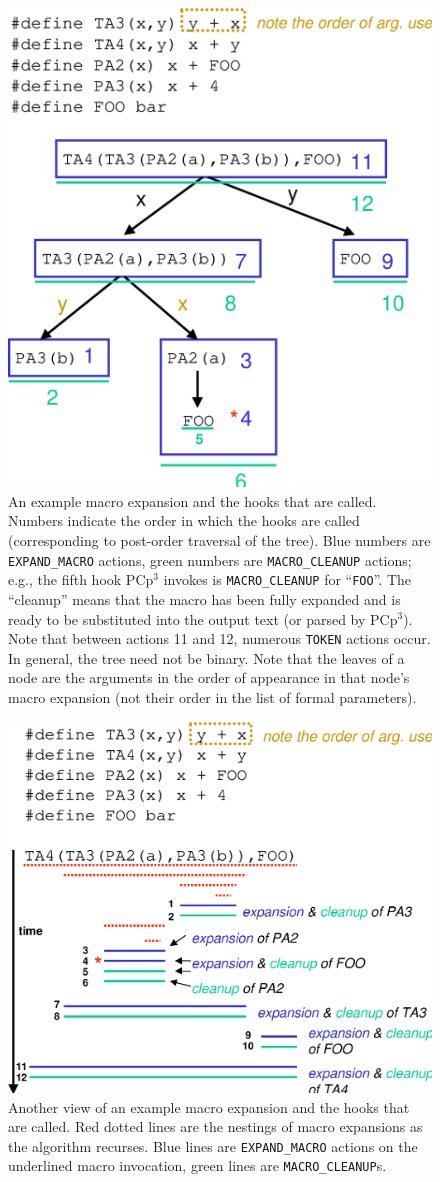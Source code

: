 \documentclass{article}
\newcommand{\pcp}{\mbox{\textsf{PCp}$^3$}}
\newcommand{\eg}{e.g.,}
\begin{document}
\begin{figure}[p]
  \begin{center}
    \leavevmode
    \includegraphics[width=0.45\linewidth]{figs/tree-expn.eps}
    \caption{An example macro expansion and the
      hooks that are called. Numbers indicate the order in which the
      hooks are called (corresponding to post-order traversal of the
      tree). Blue numbers are \texttt{EXPAND\_MACRO} actions, green
      numbers are \texttt{MACRO\_CLEANUP} actions; \eg{} the fifth hook
      \pcp{} invokes is \texttt{MACRO\_CLEANUP} for ``\texttt{FOO}''.
      The ``cleanup'' means that the macro has been fully expanded and
      is ready to be substituted into the output text (or parsed by
      \pcp{}). Note that between actions 11 and 12, numerous
      \texttt{TOKEN} actions occur.  In general, the tree need not be
      binary. Note that the leaves of a node are the arguments in the
      order of appearance in that node's macro expansion (not their
      order in the list of formal parameters).}
    \label{fig:tree-expn}
  \end{center}
\end{figure}

\begin{figure}[p]
  \begin{center}
    \leavevmode
    \includegraphics[width=0.45\linewidth]{figs/text-expn.eps}
    \caption{Another view of an example macro expansion and the hooks
    that are called.  Red dotted lines are the nestings of macro
    expansions as the algorithm recurses.  Blue lines are
    \texttt{EXPAND\_MACRO} actions on the underlined macro invocation,
    green lines are \texttt{MACRO\_CLEANUP}s.}
    \label{fig:text-expn}
  \end{center}
\end{figure}
\end{document}
